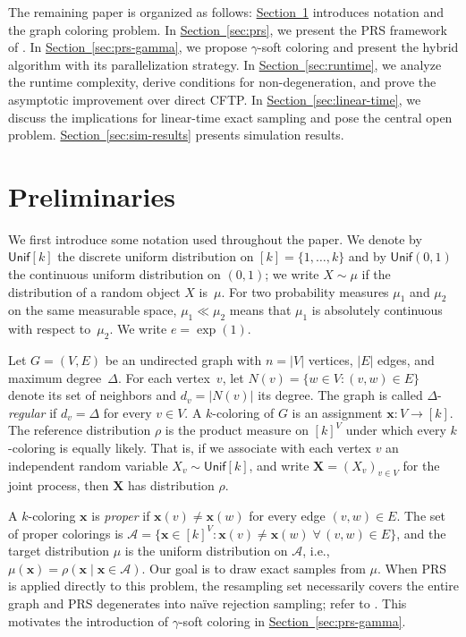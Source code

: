 \documentclass[12pt, a4paper]{article}
\theoremstyle{plain}
\theoremstyle{definition}
\theoremstyle{remark}
\newcommand{\mc}{\mathcal}
\renewcommand{\v}[1]{\boldsymbol{#1}}
\newcommand{\mx}{\v{x}}
\newcommand{\mX}{\v{X}}
\newcommand{\sref}[2]{\hyperref[#2]{#1~\ref*{#2}}}
\newcommand{\unif}{\mathsf{Unif}}
\begin{document}
The remaining paper is organized as follows: \sref{Section}{sec:prelim} introduces notation and the graph coloring problem. In \sref{Section}{sec:prs}, we present the PRS framework of \cite{GJL17}. In \sref{Section}{sec:prs-gamma}, we propose \(\gamma\)-soft coloring and present the hybrid algorithm with its parallelization strategy. In \sref{Section}{sec:runtime}, we analyze the runtime complexity, derive conditions for non-degeneration, and prove the asymptotic improvement over direct CFTP. In \sref{Section}{sec:linear-time}, we discuss the implications for linear-time exact sampling and pose the central open problem. \sref{Section}{sec:sim-results} presents simulation results.

\section{Preliminaries}\label{sec:prelim}

We first introduce some notation used throughout the paper. We denote by \(\unif[k]\) the discrete uniform distribution on \([k] = \{1,\ldots,k\}\) and by \(\unif(0,1)\) the continuous uniform distribution on \((0,1)\); we write \(X\sim\mu\) if the distribution of a random object \(X\) is~\(\mu\). For two probability measures \(\mu_1\) and \(\mu_2\) on the same measurable space, \(\mu_1\ll\mu_2\) means that \(\mu_1\) is absolutely continuous with respect to~\(\mu_2\). We write \(e=\exp(1)\).

Let \(G=(V,E)\) be an undirected graph with \(n=|V|\) vertices, \(|E|\) edges, and maximum degree~\(\Delta\). For each vertex~\(v\), let \(N(v)=\{w\in V:(v,w)\in E\}\) denote its set of neighbors and \(d_v=|N(v)|\) its degree. The graph is called \(\Delta\)-{\em regular} if \(d_v=\Delta\) for every \(v\in V\). A \(k\)-coloring of \(G\) is an assignment \(\mx:V\to[k]\). The reference distribution \(\rho\) is the product measure on \([k]^V\) under which every \(k\)-coloring is equally likely. That is, if we associate with each vertex \(v\) an independent random variable \(X_v\sim\unif[k]\), and write \(\mX=(X_v)_{v\in V}\) for the joint process, then $\mX$ has distribution $\rho$.

A \(k\)-coloring \(\mx\) is {\em proper} if \(\mx(v)\neq\mx(w)\) for every edge \((v,w)\in E\). The set of proper colorings is \(\mc{A}=\{\mx\in[k]^V:\mx(v)\neq\mx(w)\;\forall\,(v,w)\in E\}\), and the target distribution \(\mu\) is the uniform distribution on \(\mc{A}\), i.e., \(\mu(\mx)=\rho(\mx\mid\mx\in\mc{A})\). Our goal is to draw exact samples from \(\mu\). When PRS is applied directly to this problem, the resampling set necessarily covers the entire graph and PRS degenerates into na\"{i}ve rejection sampling; refer to  \cite{GJL17,BC20}. This motivates the introduction of \(\gamma\)-soft coloring in \sref{Section}{sec:prs-gamma}.
\end{document}
